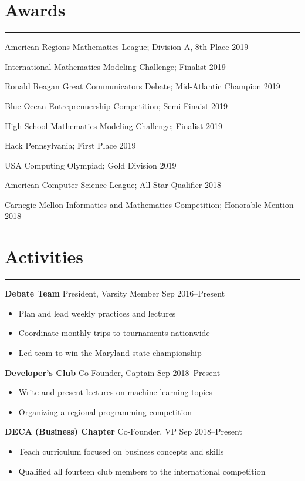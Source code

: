 \documentclass[11pt]{article}
\newcommand{\resumesection}[1]{\vspace{-0.3cm}\section*{\color{highlight}#1}\vspace{-0.3cm}\hrule\vspace{0.3cm}}
\begin{document}
\resumesection{Awards}

American Regions Mathematics League; Division A, 8th Place \hfill 2019 \par
International Mathematics Modeling Challenge; Finalist \hfill 2019\par
Ronald Reagan Great Communicators Debate; Mid-Atlantic Champion \hfill 2019 \par
Blue Ocean Entreprenuership Competition; Semi-Finaist \hfill 2019 \par
High School Mathematics Modeling Challenge; Finalist \hfill 2019\par
Hack Pennsylvania; First Place \hfill 2019\par
USA Computing Olympiad; Gold Division \hfill 2019\par
American Computer Science League; All-Star Qualifier \hfill 2018 \par 
Carnegie Mellon Informatics and Mathematics Competition; Honorable Mention \hfill 2018\par


\resumesection{Activities}

\textbf{Debate Team} President, Varsity Member \hfill Sep 2016--Present \par
\begin{itemize}
	\item Plan and lead weekly practices and lectures
	\item Coordinate monthly trips to tournaments nationwide
	\item Led team to win the Maryland state championship
\end{itemize}\vspace{0.1cm}

\textbf{Developer's Club} Co-Founder, Captain \hfill Sep 2018--Present \par
\begin{itemize}
	\item Write and present lectures on machine learning topics
	\item Organizing a regional programming competition
\end{itemize}\vspace{0.1cm}

\textbf{DECA (Business) Chapter} Co-Founder, VP \hfill Sep 2018--Present \par
\begin{itemize}
	\item Teach curriculum focused on business concepts and skills
	\item Qualified all fourteen club members to the international competition
\end{itemize}\vspace{0.1cm}
\end{document}
